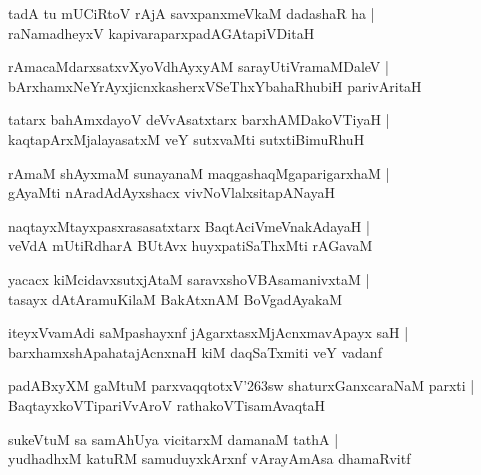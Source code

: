 \documentclass[twoside,12pt,openright]{book}
\def\S{\char'263}
\newcounter{shloka}[chapter]
\begin{document}
\begin{shloka}%
tadA tu mUCiRtoV rAjA savxpanxmeVkaM dadashaR ha |\\
raNamadheyxV kapivaraparxpadAGAtapiVDitaH 
\end{shloka}

\begin{shloka}%
rAmacaMdarxsatxvXyoVdhAyxyAM sarayUtiVramaMDaleV |\\
bArxhamxNeYrAyxjicnxkasherxVSeThxYbahaRhubiH parivAritaH 
\end{shloka}

\begin{shloka}%
tatarx bahAmxdayoV deVvAsatxtarx barxhAMDakoVTiyaH |\\
kaqtapArxMjalayasatxM veY sutxvaMti sutxtiBimuRhuH
\end{shloka}

\begin{shloka}%
rAmaM shAyxmaM sunayanaM maqgashaqMgaparigarxhaM |\\
gAyaMti nAradAdAyxshacx vivNoVlalxsitapANayaH 
\end{shloka}

\begin{shloka}%
naqtayxMtayxpasxrasasatxtarx BaqtAciVmeVnakAdayaH |\\
veVdA mUtiRdharA BUtAvx huyxpatiSaThxMti rAGavaM 
\end{shloka}

\begin{shloka}%
yacacx kiMcidavxsutxjAtaM saravxshoVBAsamanivxtaM |\\
tasayx dAtAramuKilaM BakAtxnAM BoVgadAyakaM 
\end{shloka}

\begin{shloka}%
iteyxVvamAdi saMpashayxnf jAgarxtasxMjAcnxmavApayx saH |\\
barxhamxshApahatajAcnxnaH kiM daqSaTxmiti veY vadanf 
\end{shloka}

\begin{shloka}%
padABxyXM gaMtuM parxvaqqtotxV\S sw shaturxGanxcaraNaM parxti |\\
BaqtayxkoVTipariVvAroV rathakoVTisamAvaqtaH 
\end{shloka}

\begin{shloka}%
sukeVtuM sa samAhUya vicitarxM damanaM  tathA |\\
yudhadhxM katuRM samuduyxkArxnf vArayAmAsa dhamaRvitf 
\end{shloka}
\end{document}
